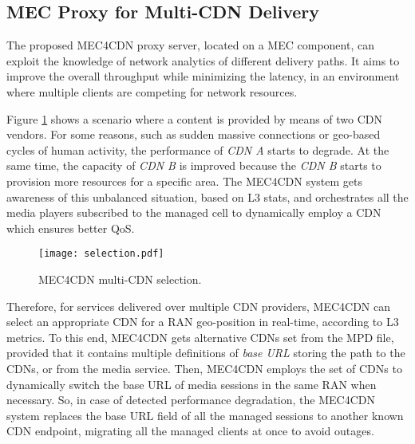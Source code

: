 \subsection{MEC Proxy for Multi-CDN Delivery}
\label{sec:BMSB2018multi-CDN}

The proposed MEC4CDN proxy server, located on a MEC component, can exploit the knowledge of network analytics of different delivery paths. It aims to improve the overall throughput while minimizing the latency, in an environment where multiple clients are competing for network resources. 

Figure \ref{fig:BMSB2018selection} shows a scenario where a content is provided by means of two CDN vendors. For some reasons, such as sudden massive connections or geo-based cycles of human activity, the performance of \textit{CDN A} starts to degrade. At the same time, the capacity of \textit{CDN B} is improved because the \textit{CDN B} starts to provision more resources for a specific area. The MEC4CDN system gets awareness of this unbalanced situation, based on L3 stats, and orchestrates all the media players subscribed to the managed cell to dynamically employ a CDN which ensures better QoS. 

\begin{figure}[htp]
	\centering
	\texttt{[image: selection.pdf]}
	\caption{MEC4CDN multi-CDN selection.}
	\label{fig:BMSB2018selection}
\end{figure}

Therefore, for services delivered over multiple CDN providers, MEC4CDN can select an appropriate CDN for a RAN geo-position in real-time, according to L3 metrics. To this end, MEC4CDN gets alternative CDNs set from the MPD file, provided that it contains multiple definitions of \textit{base URL} storing the path to the CDNs, or from the media service. Then, MEC4CDN employs the set of CDNs to dynamically switch the base URL of media sessions in the same RAN when necessary. So, in case of detected performance degradation, the MEC4CDN system replaces the base URL field of all the managed sessions to another known CDN endpoint, migrating all the managed clients at once to avoid outages.

